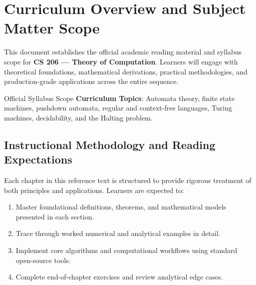 \section{Curriculum Overview and Subject Matter Scope}

This document establishes the official academic reading material and syllabus scope for \textbf{CS 206 --- Theory of Computation}. Learners will engage with theoretical foundations, mathematical derivations, practical methodologies, and production-grade applications across the entire sequence.

\begin{InsightBox}{Official Syllabus Scope}
  \textbf{Curriculum Topics}: Automata theory, finite state machines, pushdown automata, regular and context-free languages, Turing machines, decidability, and the Halting problem.
\end{InsightBox}

\subsection{Instructional Methodology and Reading Expectations}

Each chapter in this reference text is structured to provide rigorous treatment of both principles and applications. Learners are expected to:
\begin{enumerate}
  \item Master foundational definitions, theorems, and mathematical models presented in each section.
  \item Trace through worked numerical and analytical examples in detail.
  \item Implement core algorithms and computational workflows using standard open-source tools.
  \item Complete end-of-chapter exercises and review analytical edge cases.
\end{enumerate}

